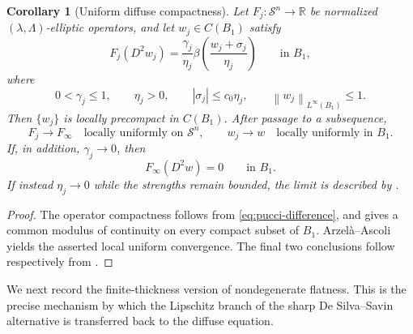 \documentclass[11pt,letterpaper]{amsart}
\numberwithin{equation}{section}
\newcommand{\Sn}{\mathcal S^n}
\newcommand{\norm}[1]{\left\lVert #1\right\rVert}
\newtheorem{corollary}[theorem]{Corollary}
\theoremstyle{definition}
\theoremstyle{remark}
\begin{document}
\begin{corollary}[Uniform diffuse compactness]
\label{lem:bounded-diffuse-compactness}
Let $F_j:\Sn\to\mathbb R$ be normalized
$(\lambda,\Lambda)$-elliptic operators, and let $w_j\in C(B_1)$ satisfy
\begin{equation}\label{eq:bounded-diffuse-sequence}
F_j(D^2w_j)
=
\frac{\gamma_j}{\eta_j}
\beta\left(\frac{w_j+\sigma_j}{\eta_j}\right)
\qquad\text{in }B_1,
\end{equation}
where
$$
0<\gamma_j\leq1,
\qquad
\eta_j>0,
\qquad
|\sigma_j|\leq c_0\eta_j,
\qquad
\norm{w_j}_{L^\infty(B_1)}\leq1.
$$
Then $\{w_j\}$ is locally precompact in $C(B_1)$.  After passage to a
subsequence,
$$
F_j\longrightarrow F_\infty
\quad\text{locally uniformly on }\Sn,
\qquad
w_j\longrightarrow w
\quad\text{locally uniformly in }B_1.
$$
If, in addition, $\gamma_j\to0$, then
\begin{equation}\label{eq:bounded-diffuse-limit}
F_\infty(D^2w)=0
\qquad\text{in }B_1.
\end{equation}
If instead $\eta_j\to0$ while the strengths remain bounded, the limit is
described by .
\end{corollary}

\begin{proof}
The operator compactness follows from \eqref{eq:pucci-difference}, and
 gives a common modulus of continuity on
every compact subset of $B_1$.  Arzel\`a--Ascoli yields the asserted local
uniform convergence.  The final two conclusions follow respectively from
.
\end{proof}

We next record the finite-thickness version of nondegenerate flatness.  This
is the precise mechanism by which the Lipschitz branch of the sharp
De Silva--Savin alternative is transferred back to the diffuse equation.
\end{document}
